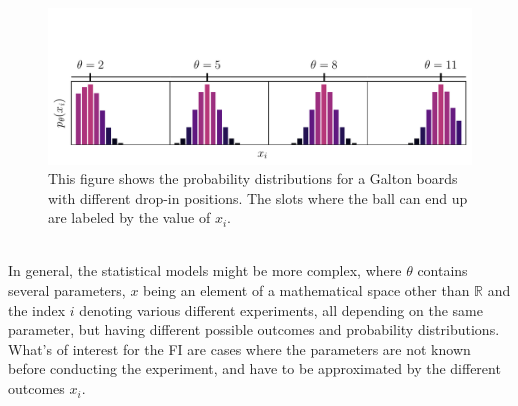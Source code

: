 \begin{figure}
	\centering
	\includegraphics[width = \textwidth, clip, trim= 0cm 0cm 0cm 2.3cm]{text/FisherInformation/plots/GaltonDistributionsPlot.pdf}
	\caption{This figure shows the probability distributions for a Galton boards with different drop-in positions. The slots where the ball can end up are labeled by the value of $x_i$.}
	\label{fig:GaltonDistributions}
\end{figure}\\
In general, the statistical models might be more complex, where $\theta$ contains several parameters, $x$ being an element of a mathematical space other than $\mathbb{R}$ and the index $i$ denoting various different experiments, all depending on the same parameter, but having different possible outcomes and probability distributions.\\
What's of interest for the FI are cases where the parameters are not known before conducting the experiment, and have to be approximated by the different outcomes $x_i$.\\

